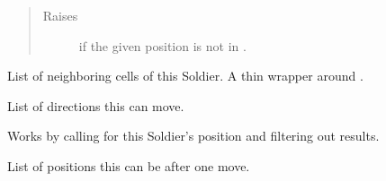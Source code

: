 \documentclass[letterpaper,10pt,english,openany,oneside]{sphinxmanual}
\begin{document}
\begin{fulllineitems}
\begin{fulllineitems}
\begin{quote}
\begin{description}
\item[{Raises}] \leavevmode
{} \textendash{} if the given position is not in {\hyperref[\detokenize{neutron:neutron.Soldier.possible_moves}]{}}.

\end{description}\end{quote}

\end{fulllineitems}


\begin{fulllineitems}
\label{\detokenize{neutron:neutron.Soldier.neighbors}}
List of neighboring cells of this Soldier. A thin wrapper around
{\hyperref[\detokenize{neutron:neutron.NeutronBoard.neighbors}]{}}.

\end{fulllineitems}


\begin{fulllineitems}
\label{\detokenize{neutron:neutron.Soldier.possible_directions}}
List of directions this {\hyperref[\detokenize{neutron:neutron.Soldier}]{}} can move.

Works by calling {\hyperref[\detokenize{neutron:neutron.NeutronBoard.furthest_empty_spot}]{}} for this
Soldier’s position and filtering out  results.

\end{fulllineitems}


\begin{fulllineitems}
\label{\detokenize{neutron:neutron.Soldier.possible_moves}}
List of positions this {\hyperref[\detokenize{neutron:neutron.Soldier}]{}} can be after one move.


\end{fulllineitems}
\end{fulllineitems}
\end{document}
